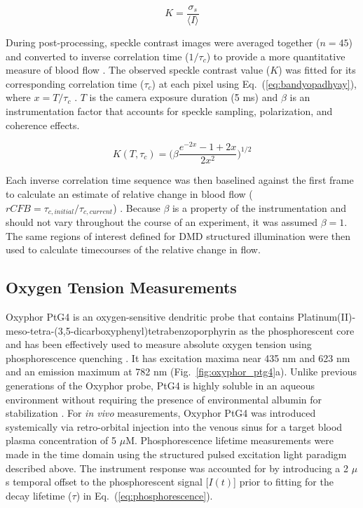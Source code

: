\documentclass[12pt]{spieman}  %
\newcommand*\rfrac[2]{{}{#1}\!/{#2}}                    %
\begin{document}
\begin{spacing}{2}
\begin{equation}
    \label{eq:speckle_contrast}
    K = \frac{\sigma_{s}}{\langle{I}\rangle}
\end{equation}

During post-processing, speckle contrast images were averaged together ($n = 45$) and converted to inverse correlation time ($\rfrac{1}{\tau_{c}}$) to provide a more quantitative measure of blood flow \cite{Briers:2001hy}. The observed speckle contrast value ($K$) was fitted for its corresponding correlation time ($\tau_{c}$) at each pixel using Eq.~(\ref{eq:bandyopadhyay}), where $x = \rfrac{T}{\tau_{c}}$ \cite{Bandyopadhyay:2005bg}. $T$ is the camera exposure duration (5 ms) and $\beta$ is an instrumentation factor that accounts for speckle sampling, polarization, and coherence effects.

\begin{equation}
    \label{eq:bandyopadhyay}
    K(T,\tau_{c}) = \bigg(\beta \frac{e^{-2x} - 1 + 2x}{2x^{2}}\bigg)^{1/2}
\end{equation}

Each inverse correlation time sequence was then baselined against the first frame to calculate an estimate of relative change in blood flow ($rCFB = \rfrac{\tau_{c,initial}}{\tau_{c,current}}$) \cite{Kazmi:2015du}. Because $\beta$ is a property of the instrumentation and should not vary throughout the course of an experiment, it was assumed $\beta = 1$. The same regions of interest defined for DMD structured illumination were then used to calculate timecourses of the relative change in flow.


\subsection{Oxygen Tension Measurements}
Oxyphor PtG4 is an oxygen-sensitive dendritic probe that contains Platinum(II)-meso-tetra-(3,5-dicarboxyphenyl)tetrabenzoporphyrin as the phosphorescent core \cite{Lebedev:2009cf,Esipova:2011hi} and has been effectively used to measure absolute oxygen tension using phosphorescence quenching \cite{Zhang:2013cd,Holt:2014cy}. It has excitation maxima near 435 nm and 623 nm and an emission maximum at 782 nm (Fig.~\ref{fig:oxyphor_ptg4}a). Unlike previous generations of the Oxyphor probe, PtG4 is highly soluble in an aqueous environment without requiring the presence of environmental albumin for stabilization \cite{Esipova:2011hi}. For \textit{in vivo} measurements, Oxyphor PtG4 was introduced systemically via retro-orbital injection into the venous sinus for a target blood plasma concentration of 5 $\mu$M. Phosphorescence lifetime measurements were made in the time domain using the structured pulsed excitation light paradigm described above. The instrument response was accounted for by introducing a 2 $\mu$s temporal offset to the phosphorescent signal [$I(t)$] prior to fitting for the decay lifetime ($\tau$) in Eq.~(\ref{eq:phosphorescence}).


\end{spacing}
\end{document}
